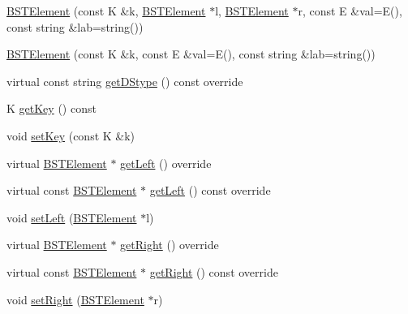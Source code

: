 \begin{DoxyCompactItemize}
\item 
\mbox{\hyperlink{classbridges_1_1datastructure_1_1_b_s_t_element_a861caf985c223a9a848082fd5a4974fd}{B\+S\+T\+Element}} (const K \&k, \mbox{\hyperlink{classbridges_1_1datastructure_1_1_b_s_t_element}{B\+S\+T\+Element}} $\ast$l, \mbox{\hyperlink{classbridges_1_1datastructure_1_1_b_s_t_element}{B\+S\+T\+Element}} $\ast$r, const E \&val=E(), const string \&lab=string())
\item 
\mbox{\hyperlink{classbridges_1_1datastructure_1_1_b_s_t_element_a839372e61dd261d3fd7df1d22dd0a5dd}{B\+S\+T\+Element}} (const K \&k, const E \&val=E(), const string \&lab=string())
\item 
virtual const string \mbox{\hyperlink{classbridges_1_1datastructure_1_1_b_s_t_element_a2bb8cc9ec4b6bc5b89ecef0f17be366f}{get\+D\+Stype}} () const override
\item 
K \mbox{\hyperlink{classbridges_1_1datastructure_1_1_b_s_t_element_a66bd1d5874e4e0c8048e03e5fff07f86}{get\+Key}} () const
\item 
void \mbox{\hyperlink{classbridges_1_1datastructure_1_1_b_s_t_element_a06d80480736ae19052e2d1bc6345323a}{set\+Key}} (const K \&k)
\item 
virtual \mbox{\hyperlink{classbridges_1_1datastructure_1_1_b_s_t_element}{B\+S\+T\+Element}} $\ast$ \mbox{\hyperlink{classbridges_1_1datastructure_1_1_b_s_t_element_af863c624691c11db26ae3b6d723d1f5c}{get\+Left}} () override
\item 
virtual const \mbox{\hyperlink{classbridges_1_1datastructure_1_1_b_s_t_element}{B\+S\+T\+Element}} $\ast$ \mbox{\hyperlink{classbridges_1_1datastructure_1_1_b_s_t_element_abac324ef0b480420bd82ecfe4501d60d}{get\+Left}} () const override
\item 
void \mbox{\hyperlink{classbridges_1_1datastructure_1_1_b_s_t_element_a5810ed79b697d691f4d8a75c2f9b639f}{set\+Left}} (\mbox{\hyperlink{classbridges_1_1datastructure_1_1_b_s_t_element}{B\+S\+T\+Element}} $\ast$l)
\item 
virtual \mbox{\hyperlink{classbridges_1_1datastructure_1_1_b_s_t_element}{B\+S\+T\+Element}} $\ast$ \mbox{\hyperlink{classbridges_1_1datastructure_1_1_b_s_t_element_a80f5085d6d03805dd3091b7693d8e235}{get\+Right}} () override
\item 
virtual const \mbox{\hyperlink{classbridges_1_1datastructure_1_1_b_s_t_element}{B\+S\+T\+Element}} $\ast$ \mbox{\hyperlink{classbridges_1_1datastructure_1_1_b_s_t_element_a012f0eb09c3d62b14c73109e6ded0879}{get\+Right}} () const override
\item 
void \mbox{\hyperlink{classbridges_1_1datastructure_1_1_b_s_t_element_a9656227e934249edd0e414189c2cdae9}{set\+Right}} (\mbox{\hyperlink{classbridges_1_1datastructure_1_1_b_s_t_element}{B\+S\+T\+Element}} $\ast$r)
\end{DoxyCompactItemize}
